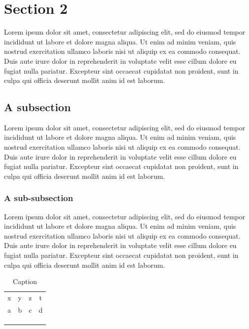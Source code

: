 \documentclass{fulbrightthesis}
\begin{document}
\section{Section 2} %

Lorem ipsum dolor sit amet, consectetur adipiscing elit, sed do eiusmod tempor incididunt ut labore et dolore magna aliqua. Ut enim ad minim veniam, quis nostrud exercitation ullamco laboris nisi ut aliquip ex ea commodo consequat. Duis aute irure dolor in reprehenderit in voluptate velit esse cillum dolore eu fugiat nulla pariatur. Excepteur sint occaecat cupidatat non proident, sunt in culpa qui officia deserunt mollit anim id est laborum.

\subsection{A subsection}
Lorem ipsum dolor sit amet, consectetur adipiscing elit, sed do eiusmod tempor incididunt ut labore et dolore magna aliqua. Ut enim ad minim veniam, quis nostrud exercitation ullamco laboris nisi ut aliquip ex ea commodo consequat. Duis aute irure dolor in reprehenderit in voluptate velit esse cillum dolore eu fugiat nulla pariatur. Excepteur sint occaecat cupidatat non proident, sunt in culpa qui officia deserunt mollit anim id est laborum.

\subsubsection{A sub-subsection}

Lorem ipsum dolor sit amet, consectetur adipiscing elit, sed do eiusmod tempor incididunt ut labore et dolore magna aliqua. Ut enim ad minim veniam, quis nostrud exercitation ullamco laboris nisi ut aliquip ex ea commodo consequat. Duis aute irure dolor in reprehenderit in voluptate velit esse cillum dolore eu fugiat nulla pariatur. Excepteur sint occaecat cupidatat non proident, sunt in culpa qui officia deserunt mollit anim id est laborum.

\cite{Berry1995}

\begin{table}
    \centering
    \begin{tabular}{cccc}
        x & y & z & t\\
       a  & b & c & d\\
         &  &  & \\
         &  &  & \\
         &  &  & \\
    \end{tabular}
    \caption{Caption}
    \label{tab:my_label}
\end{table}
\end{document}
